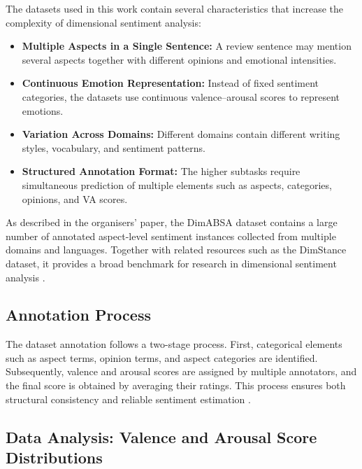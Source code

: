\documentclass{article}
\begin{document}
The datasets used in this work contain several characteristics that increase the complexity of dimensional sentiment analysis:

\begin{itemize}
    \item \textbf{Multiple Aspects in a Single Sentence:} A review sentence may mention several aspects together with different opinions and emotional intensities.
    
    \item \textbf{Continuous Emotion Representation:} Instead of fixed sentiment categories, the datasets use continuous valence–arousal scores to represent emotions.
    
    \item \textbf{Variation Across Domains:} Different domains contain different writing styles, vocabulary, and sentiment patterns.
    
    \item \textbf{Structured Annotation Format:} The higher subtasks require simultaneous prediction of multiple elements such as aspects, categories, opinions, and VA scores.
\end{itemize}

As described in the organisers' paper, the DimABSA dataset contains a large number of annotated aspect-level sentiment instances collected from multiple domains and languages. Together with related resources such as the DimStance dataset, it provides a broad benchmark for research in dimensional sentiment analysis \cite{lee2026dimabsabuildingmultilingualmultidomain}.

\subsection{Annotation Process}

The dataset annotation follows a two-stage process. First, categorical elements such as aspect terms, opinion terms, and aspect categories are identified. Subsequently, valence and arousal scores are assigned by multiple annotators, and the final score is obtained by averaging their ratings. This process ensures both structural consistency and reliable sentiment estimation \cite{lee2026dimabsabuildingmultilingualmultidomain}.

\subsection{Data Analysis: Valence and Arousal Score Distributions}
\label{subsec:data_analysis}
\end{document}
